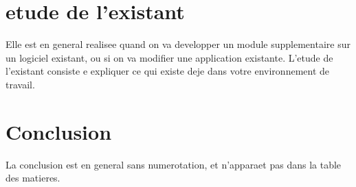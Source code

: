 \begin{spacing}{1.2}
\section{etude de l'existant}
Elle est en general realisee quand on va developper un module supplementaire sur un 
logiciel existant, ou si on va modifier une application existante. L'etude de l'existant
consiste e expliquer ce qui existe deje dans votre environnement de travail.

\section*{Conclusion}
La conclusion est en general sans numerotation, et n'apparaet pas dans la table des matieres.


\end{spacing}
